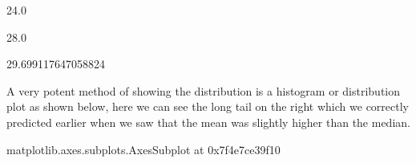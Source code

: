 \documentclass[letterpaper,10pt,english]{jupyterBook}
\begin{document}
\begin{sphinxVerbatim}[commandchars=\\\{\}]
24.0
\end{sphinxVerbatim}

\begin{sphinxVerbatim}[commandchars=\\\{\}]
\PYG{p}{[}\PYG{p}{]}
\end{sphinxVerbatim}

\begin{sphinxVerbatim}[commandchars=\\\{\}]
28.0
\end{sphinxVerbatim}

\begin{sphinxVerbatim}[commandchars=\\\{\}]
\PYG{p}{[}\PYG{p}{]}
\end{sphinxVerbatim}

\begin{sphinxVerbatim}[commandchars=\\\{\}]
29.699117647058824
\end{sphinxVerbatim}

\sphinxAtStartPar
A very potent method of showing the distribution is a histogram or distribution plot as shown below, here we can see the long tail on the right which we correctly predicted earlier when we saw that the mean was slightly higher than the median.

\begin{sphinxVerbatim}[commandchars=\\\{\}]
\PYG{p}{[}\PYG{p}{]}
\end{sphinxVerbatim}

\begin{sphinxVerbatim}[commandchars=\\\{\}]
\PYGZlt{}matplotlib.axes.\PYGZus{}subplots.AxesSubplot at 0x7f4e7ce39f10\PYGZgt{}
\end{sphinxVerbatim}
\end{document}
